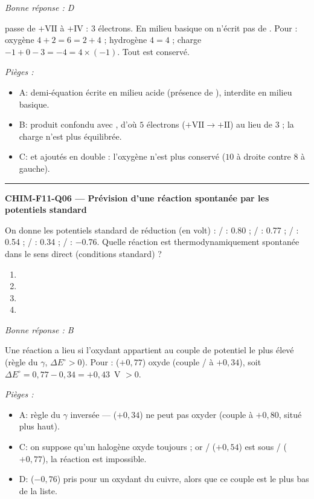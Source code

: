 \documentclass[11pt,a4paper]{article}
\begin{document}
\textit{Bonne réponse : D}\par
{} passe de $+\mathrm{VII}$ à $+\mathrm{IV}$ : $3$ électrons. En milieu basique on n'écrit pas de . Pour  : oxygène $4+2=6=2+4$ ; hydrogène $4=4$ ; charge $-1+0-3=-4=4\times(-1)$. Tout est conservé.\par
\textit{Pièges :}
\begin{itemize}
\item A: demi-équation écrite en milieu acide (présence de ), interdite en milieu basique.
\item B: produit  confondu avec , d'où $5$ électrons ($+\mathrm{VII}\to+\mathrm{II}$) au lieu de $3$ ; la charge n'est plus équilibrée.
\item C:  et  ajoutés en double : l'oxygène n'est plus conservé ($10$ à droite contre $8$ à gauche).
\end{itemize}
\vspace{8pt}\hrule\vspace{8pt}
\noindent\textbf{CHIM-F11-Q06 --- Prévision d'une réaction spontanée par les potentiels standard}\par
On donne les potentiels standard de réduction (en volt) : / : \num{+0.80} ; / : \num{+0.77} ; / : \num{+0.54} ; / : \num{+0.34} ; / : \num{-0.76}. Quelle réaction est thermodynamiquement spontanée dans le sens direct (conditions standard) ?
\begin{enumerate}[label=\Alph*)]
\item {}
\item {}
\item {}
\item {}
\end{enumerate}
\textit{Bonne réponse : B}\par
Une réaction a lieu si l'oxydant appartient au couple de potentiel le plus élevé (règle du $\gamma$, $\Delta E^\circ>0$). Pour  :  ($+0{,}77$) oxyde  (couple / à $+0{,}34$), soit $\Delta E^\circ=0{,}77-0{,}34=+0{,}43$~V $>0$.\par
\textit{Pièges :}
\begin{itemize}
\item A: règle du $\gamma$ inversée —  ($+0{,}34$) ne peut pas oxyder  (couple à $+0{,}80$, situé plus haut).
\item C: on suppose qu'un halogène  oxyde toujours ; or / ($+0{,}54$) est sous / ($+0{,}77$), la réaction est impossible.
\item D:  ($-0{,}76$) pris pour un oxydant du cuivre, alors que ce couple est le plus bas de la liste.
\end{itemize}
\end{document}
